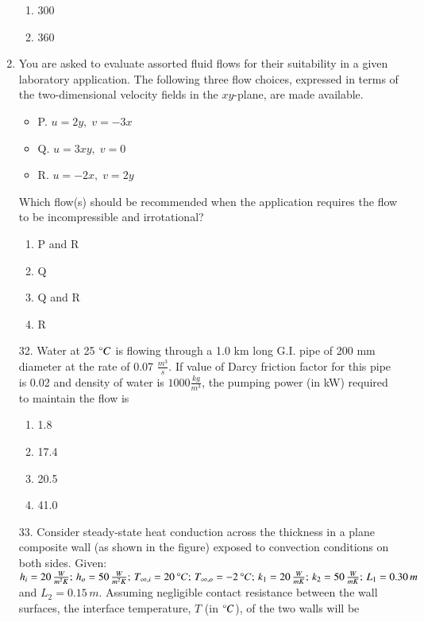 \documentclass[journal]{IEEEtran}
\begin{document}
\begin{enumerate}
\begin{enumerate}
    \item  300
    \item  360
  \end{enumerate}
  \item You are asked to evaluate assorted fluid flows for their suitability in a given laboratory application. The following three flow choices, expressed in terms of the two-dimensional velocity fields in the $xy$-plane, are made available.
\begin{itemize}
    \item P. $u = 2y, \; v = -3x$
    \item Q. $u = 3xy, \; v = 0$
    \item R. $u = -2x, \; v = 2y$
\end{itemize}
Which flow(s) should be recommended when the application requires the flow to be incompressible and irrotational?
\begin{enumerate}
    \item  P and R
    \item  Q
    \item  Q and R
    \item  R
  \end{enumerate}
\item[32.] Water at 25 $\degree C$ is flowing through a 1.0 km long G.I. pipe of 200 mm diameter at the rate of 0.07 $\frac{m^3}{s}$. If value of Darcy friction factor for this pipe is 0.02 and density of water is $1000 \frac{kg}{m^3}$, the pumping power (in kW) required to maintain the flow is
\begin{enumerate}
    \item  1.8
    \item  17.4
    \item  20.5
    \item  41.0
  \end{enumerate}
  \item[33.] Consider steady-state heat conduction across the thickness in a plane composite wall (as shown in the figure) exposed to convection conditions on both sides.
Given: $h_i = 20 \, \frac{W}{m^2K}; \, h_o = 50 \, \frac{W}{m^2K}; \, T_{\infty,i} = 20 \,\degree C; \, T_{\infty,o} = -2 \,\degree C; \, k_1 = 20 \, \frac{W}{mK}; \, k_2 = 50 \, \frac{W}{mK}; \, L_1 = 0.30 \, m$ and $L_2 = 0.15 \, m$. 
Assuming negligible contact resistance between the wall surfaces, the interface temperature, $T$ (in $\degree C$), of the two walls will be
 \begin{figure}[!ht]
    \centering

\end{figure}
\end{enumerate}
\end{document}
